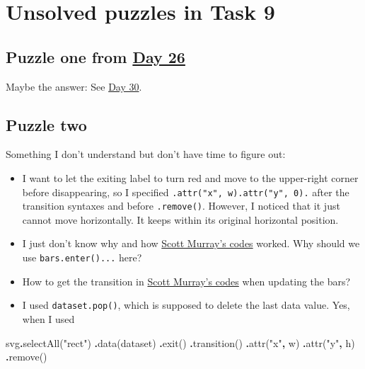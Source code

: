 \documentclass[
]{book}
\newenvironment{Shaded}{\begin{snugshade}}{\end{snugshade}}
\newcommand{\FunctionTok}[1]{\textcolor[rgb]{0.00,0.00,0.00}{#1}}
\newcommand{\NormalTok}[1]{#1}
\newcommand{\OperatorTok}[1]{\textcolor[rgb]{0.81,0.36,0.00}{\textbf{#1}}}
\newcommand{\StringTok}[1]{\textcolor[rgb]{0.31,0.60,0.02}{#1}}
\begin{document}
\hypertarget{unsolved-puzzles-in-task-9}{%
\section{Unsolved puzzles in Task 9}\label{unsolved-puzzles-in-task-9}}

\hypertarget{puzzle-one-from-day-26}{%
\subsection{\texorpdfstring{Puzzle one from \href{https://observablehq.com/@hongtaoh/day-twenty-six-2020-09-19}{Day 26}}{Puzzle one from Day 26}}\label{puzzle-one-from-day-26}}

Maybe the answer: See \href{https://observablehq.com/@hongtaoh/day-thirty-2020-09-22}{Day 30}.

\hypertarget{puzzle-two}{%
\subsection{Puzzle two}\label{puzzle-two}}

Something I don't understand but don't have time to figure out:

\begin{itemize}
\item
  I want to let the exiting label to turn red and move to the upper-right corner before disappearing, so I specified \texttt{.attr("x",\ w).attr("y",\ 0).} after the transition syntaxes and before \texttt{.remove()}. However, I noticed that it just cannot move horizontally. It keeps within its original horizontal position.
\item
  I just don't know why and how \href{https://github.com/scotthmurray/d3-book/blob/master/chapter_09/26_removing_values.html}{Scott Murray's codes} worked. Why should we use \texttt{bars.enter()...} here?
\item
  How to get the transition in \href{https://github.com/scotthmurray/d3-book/blob/master/chapter_09/26_removing_values.html}{Scott Murray's codes} when updating the bars?
\item
  I used \texttt{dataset.pop()}, which is supposed to delete the last data value. Yes, when I used
\end{itemize}

\begin{Shaded}
\begin{Highlighting}[]
\NormalTok{svg}\OperatorTok{.}\FunctionTok{selectAll}\NormalTok{(}\StringTok{"rect"}\NormalTok{)}
                \OperatorTok{.}\FunctionTok{data}\NormalTok{(dataset)}
                \OperatorTok{.}\FunctionTok{exit}\NormalTok{()}
                \OperatorTok{.}\FunctionTok{transition}\NormalTok{()}
                \OperatorTok{.}\FunctionTok{attr}\NormalTok{(}\StringTok{"x"}\OperatorTok{,}\NormalTok{ w)}
                \OperatorTok{.}\FunctionTok{attr}\NormalTok{(}\StringTok{"y"}\OperatorTok{,}\NormalTok{ h)}
                \OperatorTok{.}\FunctionTok{remove}\NormalTok{()}
\end{Highlighting}
\end{Shaded}
\end{document}
